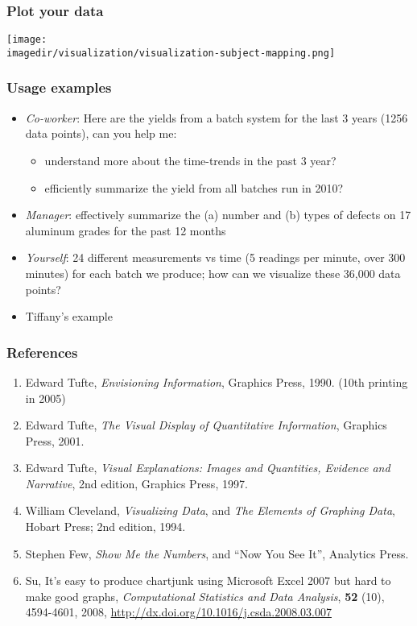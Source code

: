 \begin{frame}\frametitle{Plot your data}
	\begin{center}
		\texttt{[image: \\imagedir/visualization/visualization-subject-mapping.png]}
	\end{center}
\end{frame}

\begin{frame}\frametitle{Usage examples}
	\begin{itemize}
		\item	\emph{Co-worker}: Here are the yields from a batch system for the last 3 years (1256 data points), can you help me: 
		\begin{itemize}
			\item	understand more about the time-trends in the past 3 year? 
			\item	efficiently summarize the yield from all batches run in 2010? \pause 
		\end{itemize}
		\item	\emph{Manager}: effectively summarize the (a) number and (b) types of defects on 17 aluminum grades for the past 12 months \pause 
		\item	\emph{Yourself}: 24 different measurements vs time (5 readings per minute, over 300 minutes) for each batch we produce; how can we visualize these 36,000 data points? 
		\item	Tiffany's example
	\end{itemize}
\end{frame}

\begin{frame}\frametitle{References}
	\begin{enumerate}
		\item	Edward Tufte, \emph{Envisioning Information}, Graphics Press, 1990. (10th printing in 2005) 
		\item	Edward Tufte, \emph{The Visual Display of Quantitative Information}, Graphics Press, 2001. 
		\item	Edward Tufte, \emph{Visual Explanations: Images and Quantities, Evidence and Narrative}, 2nd edition, Graphics Press, 1997. 
		\item	William Cleveland, \emph{Visualizing Data}, and \emph{The Elements of Graphing Data}, Hobart Press; 2nd edition, 1994. 
		\item	Stephen Few, \emph{Show Me the Numbers}, and ``Now You See It'', Analytics Press. 
		\item	Su, It's easy to produce chartjunk using Microsoft Excel 2007 but hard to make good graphs, \emph{Computational Statistics and Data Analysis}, \textbf{52} (10), 4594-4601, 2008, \href{http://dx.doi.org/10.1016/j.csda.2008.03.007}{http://dx.doi.org/10.1016/j.csda.2008.03.007} 
	\end{enumerate}
\end{frame}

